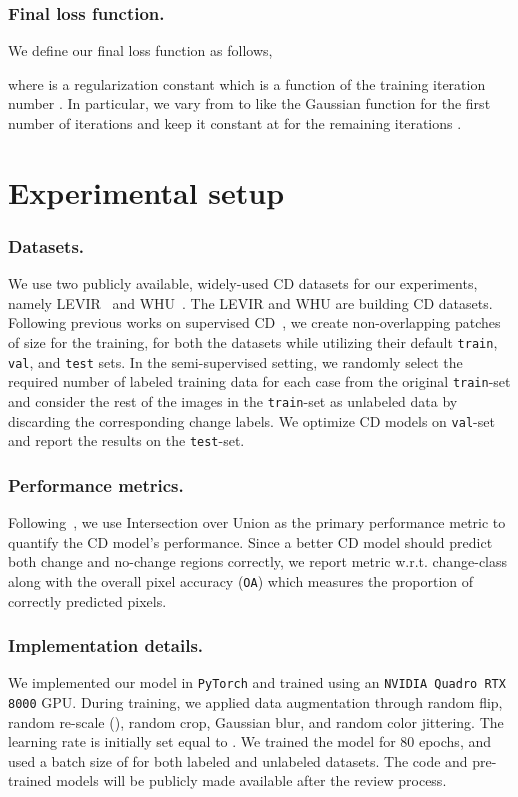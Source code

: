 \documentclass[runningheads]{llncs}
\begin{document}
\subsubsection{Final loss function.} We define our final loss function  as follows,

where  is a regularization constant which is a function of the training iteration number . In particular, we vary  from  to  like the Gaussian function for the first  number of iterations and keep it constant at  for the remaining iterations .
\vspace{-5mm}
\section{Experimental setup}
\subsubsection{Datasets.} 
\vspace{-4mm}
We use two publicly available, widely-used CD datasets for our experiments, namely LEVIR~\cite{levid-cd} and WHU~\cite{whu-cd}. The LEVIR and WHU are building CD datasets. Following previous works on supervised CD~\cite{bit,changeformer}, we create non-overlapping patches of size  for the training, for both the datasets while utilizing their default \texttt{train}, \texttt{val}, and \texttt{test} sets. In the semi-supervised setting, we randomly select the required number of labeled training data for each case from the original \texttt{train}-set and consider the rest of the images in the \texttt{train}-set as unlabeled data by discarding the corresponding change labels. We optimize CD models on \texttt{val}-set and report the results on the \texttt{test}-set.
\vspace{-5mm}
\subsubsection{Performance metrics.} Following~\cite{bit,changeformer}, we use Intersection over Union  as the primary performance metric to quantify the CD model's performance. Since a better CD model should predict both change and no-change regions correctly, we report  metric w.r.t. change-class  along with the overall pixel accuracy (\texttt{OA}) which measures the proportion of correctly predicted pixels.
\vspace{-5mm}
\subsubsection{Implementation details.} We implemented our model in \texttt{PyTorch} and trained using an \texttt{NVIDIA Quadro RTX 8000} GPU. During training, we applied data augmentation through random flip, random re-scale (), random crop, Gaussian blur, and random color jittering. The learning rate is initially set equal to . We trained the model for 80 epochs, and  used a batch size of  for both labeled and unlabeled datasets. The code and pre-trained models will be publicly made available after the review process. 
\end{document}
